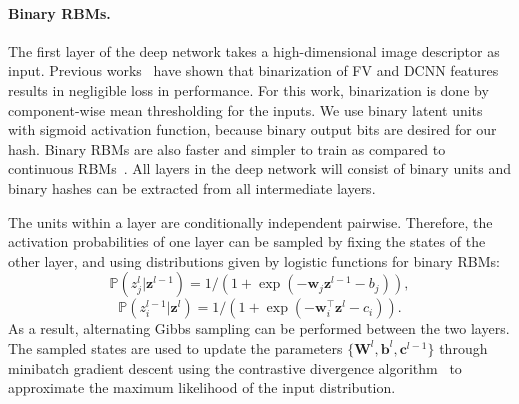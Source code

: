 \documentclass[10pt,twocolumn,letterpaper]{article}
\begin{document}
\paragraph{Binary RBMs.}
The first layer of the deep network takes a high-dimensional image descriptor as input. Previous works~\cite{Perronnin_CVPR_10,agrawal14analyzing} have shown that binarization of FV and DCNN features results in negligible loss in performance. For this work, binarization is done by component-wise mean thresholding for the inputs. 
We use binary latent units with sigmoid activation function, because binary output bits are desired for our hash. 
Binary RBMs are also faster and simpler to train as compared to continuous RBMs~\cite{RBMPracticalGuide}. 
All layers in the deep network will consist of binary units and binary hashes can be extracted from all intermediate layers.

The units within a layer are conditionally independent pairwise.
Therefore, the activation probabilities of one layer can be sampled by fixing the states of the other layer, and using distributions given by logistic functions for binary RBMs:
\begin{equation}
\mathbb{P}(z^{l}_j| \mathbf{z}^{l-1}) = 1/(1+\exp(-\mathbf{w}_{j} \mathbf{z}^{l-1} - b_j)),
\label{eq:alt_1}
\end{equation}
\begin{equation}
\mathbb{P}(z^{l-1}_i| \mathbf{z}^{l}) = 1/(1+\exp(-\mathbf{w}_{i}^{\top}\mathbf{z}^{l}-c_i)).
\label{eq:alt_2}
\end{equation}
As a result, alternating Gibbs sampling can be performed between the two layers. The sampled states are used to update the parameters $\{\mathbf{W}^{l},\mathbf{b}^{l},\mathbf{c}^{l-1}\}$ through minibatch gradient descent using the contrastive divergence algorithm~\cite{hintonCD} to approximate the maximum likelihood of the input distribution.
\end{document}
